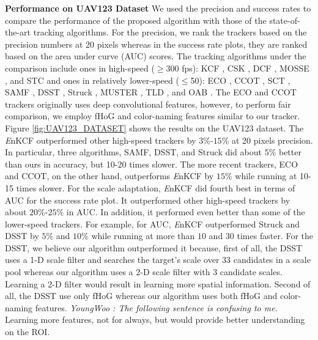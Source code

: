 \documentclass[10pt,twocolumn,letterpaper]{article}
\begin{document}
\textbf{Performance on UAV123 Dataset} We used the precision and
success rates to compare the performance of the proposed algorithm
with those of the state-of-the-art tracking algorithms. For the
precision, we rank the trackers based on the precision numbers at 20
pixels whereas in the success rate plots, they are ranked based on the
area under curve (AUC) scores. The tracking algorithms under the
comparison include ones in high-speed ($\geq$300 fps): KCF
\cite{henriques2015high}, CSK \cite{henriques2012exploiting}, DCF
\cite{henriques2015high}, MOSSE \cite{bolme2010visual}, and STC
\cite{zhang2014fast} and ones in relatively lower-speed ($\leq$50):
ECO \cite{DanelljanCVPR2017}, CCOT \cite{DanelljanECCV2016}, SCT
\cite{Choi_2016_CVPR}, SAMF \cite{li2014scale}, DSST
\cite{danelljan2014accurate}, Struck \cite{hare2012efficient}, MUSTER
\cite{hong2015multi}, TLD \cite{kalal2012tracking}, and OAB
\cite{zhang2012robust}. The ECO and CCOT trackers originally uses deep
convolutional features, however, to perform fair comparison, we employ
fHoG and color-naming features similar to our tracker. Figure
\ref{fig:UAV123_DATASET} shows the results on the UAV123 dataset. The
    {\it E}nKCF outperformed other high-speed trackers by $3\%$-$15\%$
    at 20 pixels precision. In particular, three algorithms, SAMF,
    DSST, and Struck did about $5\%$ better than ours in accuracy, but
    10-20 times slower. The more recent trackers, ECO and CCOT, on the
    other hand, outperforms {\it E}nKCF by $15\%$ while running at
    10-15 times slower. For the scale adaptation, {\it E}nKCF did
    fourth best in terms of AUC for the success rate plot. It
    outperformed other high-speed trackers by about $20\%$-$25\%$ in
    AUC. In addition, it performed even better than some of the
    lower-speed trackers.  For example, for AUC, {\it E}nKCF
    outperformed Struck and DSST by $5\%$ and $10\%$ while running at
    more than $10$ and $30$ times faster. For the DSST, we believe our
    algorithm outperformed it because, first of all, the DSST uses a
    1-D scale filter and searches the target's scale over 33
    candidates in a scale pool whereas our algorithm uses a 2-D scale
    filter with 3 candidate scales. Learning a 2-D filter would result
    in learning more spatial information. Second of all, the DSST use
    only fHoG whereas our algorithm uses both fHoG and color-naming
    features. \textit{YoungWoo : The following sentence is confusing to me.} Learning more features, not for always, but would
    provide better understanding on the ROI.
    
\end{document}
